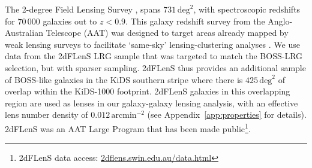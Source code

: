 The 2-degree Field Lensing Survey
\citep[2dFLenS,][]{blake/etal:2016}, spans $731\,\mathrm{deg}^{2}$, with
spectroscopic redshifts for $70\,000$ galaxies out to $z<0.9$.   This
galaxy redshift survey from the Anglo-Australian Telescope (AAT) was designed
to target areas already mapped by weak lensing surveys to facilitate `same-sky'
lensing-clustering analyses
\citep{johnson/etal:2017,amon/etal:2018,joudaki/etal:2018, blake/etal:2020}.
We use data from the 2dFLenS LRG sample that was targeted to match
the BOSS-LRG selection, but with sparser sampling.  2dFLenS
thus provides an additional sample of BOSS-like galaxies in the KiDS
southern stripe where there is $425\,\mathrm{deg}^{2}$ of overlap within
the KiDS-1000 footprint.  2dFLenS galaxies in this overlapping region are used as lenses in
our galaxy-galaxy lensing analysis, with an effective lens number density of $0.012\,\mathrm{arcmin}^{-2}$ (see Appendix~\ref{app:properties} for details).  2dFLenS was an AAT Large Program that has been made public\footnote{2dFLenS data
  access: \href{http://2dflens.swin.edu.au/data.html}{2dflens.swin.edu.au/data.html}}.   

